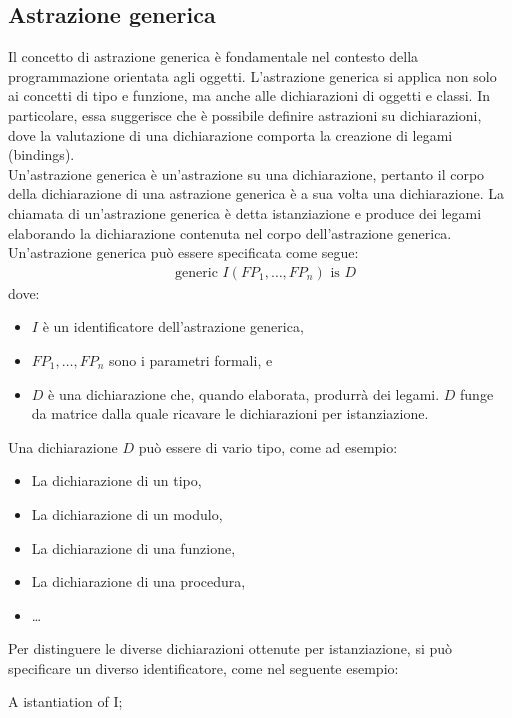 \documentclass{article}
\begin{document}
	\subsection{Astrazione generica}
	Il concetto di astrazione generica è fondamentale nel contesto della programmazione orientata agli oggetti. L'astrazione generica si applica non solo ai concetti di tipo e funzione, ma anche alle dichiarazioni di oggetti e classi. In particolare, essa suggerisce che è possibile definire astrazioni su dichiarazioni, dove la valutazione di una dichiarazione comporta la creazione di legami (bindings). \\
	Un'astrazione generica è un'astrazione su una dichiarazione, pertanto il corpo della dichiarazione di una astrazione generica è a sua volta una dichiarazione. La chiamata di un'astrazione generica è detta istanziazione e produce dei legami elaborando la dichiarazione contenuta nel corpo dell'astrazione generica.
	\vspace{\baselineskip} \\
	Un'astrazione generica può essere specificata come segue:
	\begin{align*}
	& \text{generic } I(FP_1, \ldots, FP_n) \text{ is } D
	\end{align*}
	dove:
	\begin{itemize}
		\item $I$ è un identificatore dell'astrazione generica,
		\item $FP_1, \ldots, FP_n$ sono i parametri formali, e
		\item $D$ è una dichiarazione che, quando elaborata, produrrà dei legami. $D$ funge da matrice dalla quale ricavare le dichiarazioni per istanziazione.
	\end{itemize}
	Una dichiarazione $D$ può essere di vario tipo, come ad esempio:
	\begin{itemize}
		\item La dichiarazione di un tipo,
		\item La dichiarazione di un modulo,
		\item La dichiarazione di una funzione,
		\item La dichiarazione di una procedura,
		\item \ldots
	\end{itemize}
	Per distinguere le diverse dichiarazioni ottenute per istanziazione, si può specificare un diverso identificatore, come nel seguente esempio:
	\begin{center}
		A istantiation of I;
	\end{center}
\end{document}
